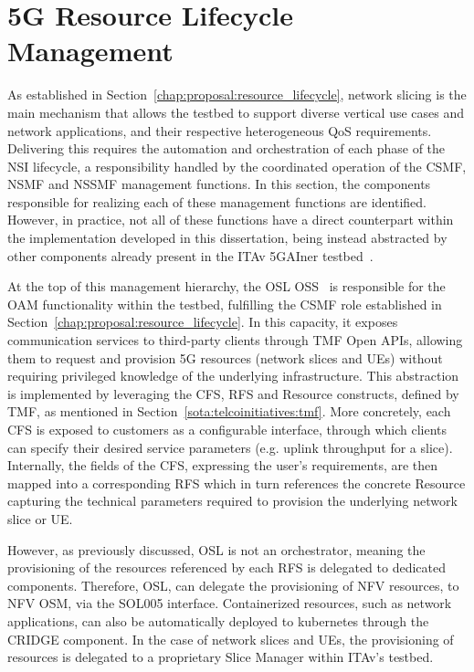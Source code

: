 \section{\acs{5G} Resource Lifecycle Management}
\label{chap:impl:resource_lifecycle}

As established in Section~\ref{chap:proposal:resource_lifecycle}, network slicing is the main mechanism that allows the testbed to support diverse vertical use cases and network applications, and their respective heterogeneous \acs{QoS} requirements. Delivering this requires the automation and orchestration of each phase of the \acs{NSI} lifecycle, a responsibility handled by the coordinated operation of the \acs{CSMF}, \acs{NSMF} and \acs{NSSMF} management functions. In this section, the components responsible for realizing each of these management functions are identified. However, in practice, not all of these functions have a direct counterpart within the implementation developed in this dissertation, being instead abstracted by other components already present in the \acs{ITAv} 5GAIner testbed~\cite{5GAIner}.

At the top of this management hierarchy, the \acs{OSL} \acs{OSS}~\cite{OpenSlice} is responsible for the \acs{OAM} functionality within the testbed, fulfilling the \acs{CSMF} role established in Section~\ref{chap:proposal:resource_lifecycle}. In this capacity, it exposes communication services to third-party clients through \acs{TMF} Open \acsp{API}, allowing them to request and provision \acs{5G} resources (network slices and \acsp{UE}) without requiring privileged knowledge of the underlying infrastructure. This abstraction is implemented by leveraging the \acf{CFS}, \acf{RFS} and Resource constructs, defined by \acs{TMF}, as mentioned in Section~\ref{sota:telcoinitiatives:tmf}. More concretely, each \acs{CFS} is exposed to customers as a configurable interface, through which clients can specify their desired service parameters (e.g. uplink throughput for a slice). Internally, the fields of the \acs{CFS}, expressing the user's requirements, are then mapped into a corresponding \acs{RFS} which in turn references the concrete Resource capturing the technical parameters required to provision the underlying network slice or \acs{UE}.

However, as previously discussed, \acs{OSL} is not an orchestrator, meaning the provisioning of the resources referenced by each \acs{RFS} is delegated to dedicated components. Therefore, \acs{OSL}, can delegate the provisioning of \acs{NFV} resources, to \acs{NFV} \acs{OSM}, via the SOL005 interface. Containerized resources, such as network applications, can also be automatically deployed to kubernetes through the CRIDGE component. In the case of network slices and \acsp{UE}, the provisioning of resources is delegated to a proprietary Slice Manager within \acs{ITAv}'s testbed.

